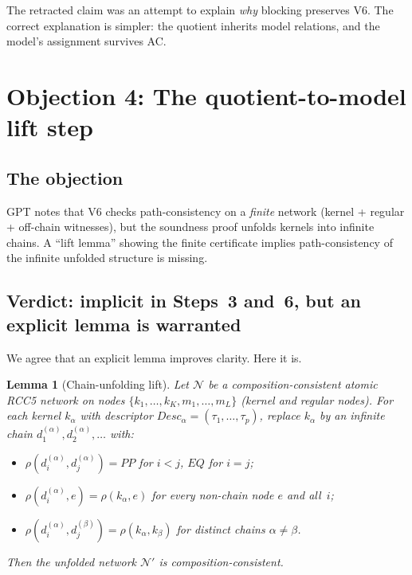 \documentclass[11pt]{article}
\newcommand{\PP}{\mathit{PP}}
\newcommand{\EQ}{\mathit{EQ}}
\newcommand{\Desc}{\mathit{Desc}}
\newtheorem{lemma}[theorem]{Lemma}
\theoremstyle{definition}
\begin{document}
The retracted claim was an attempt to explain \emph{why}
blocking preserves V6.  The correct explanation is simpler: the
quotient inherits model relations, and the model's assignment
survives AC.

\section{Objection 4: The quotient-to-model lift step}

\subsection{The objection}

GPT notes that V6 checks path-consistency on a \emph{finite}
network (kernel + regular + off-chain witnesses), but the
soundness proof unfolds kernels into infinite chains.  A
``lift lemma'' showing the finite certificate implies
path-consistency of the infinite unfolded structure is missing.

\subsection{Verdict: implicit in Steps~3 and~6, but an explicit
lemma is warranted}

We agree that an explicit lemma improves clarity.  Here it is.

\begin{lemma}[Chain-unfolding lift]\label{lem:lift}
Let $\mathcal{N}$ be a composition-consistent atomic RCC5
network on nodes $\{k_1, \ldots, k_K, m_1, \ldots, m_L\}$
(kernel and regular nodes).  For each kernel $k_\alpha$ with
descriptor $\Desc_\alpha = (\tau_1, \ldots, \tau_p)$, replace
$k_\alpha$ by an infinite chain
$d_1^{(\alpha)}, d_2^{(\alpha)}, \ldots$ with:
\begin{itemize}
\item $\rho(d_i^{(\alpha)}, d_j^{(\alpha)}) = \PP$ for $i < j$,
  $\EQ$ for $i = j$;
\item $\rho(d_i^{(\alpha)}, e) = \rho(k_\alpha, e)$ for every
  non-chain node $e$ and all~$i$;
\item $\rho(d_i^{(\alpha)}, d_j^{(\beta)}) =
  \rho(k_\alpha, k_\beta)$ for distinct chains $\alpha \ne \beta$.
\end{itemize}
Then the unfolded network $\mathcal{N}'$ is
composition-consistent.
\end{lemma}
\end{document}
